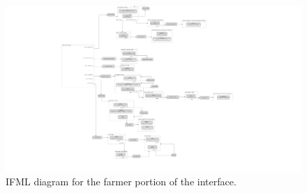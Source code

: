 \documentclass{article}
\begin{document}
\begin{figure}
    \centering
     \includegraphics[scale=0.07]{diagrams/ui diagrams/farmer/farmer.png}
    \caption{IFML diagram for the farmer portion of the interface.}
\end{figure}
\newpage
\end{document}
